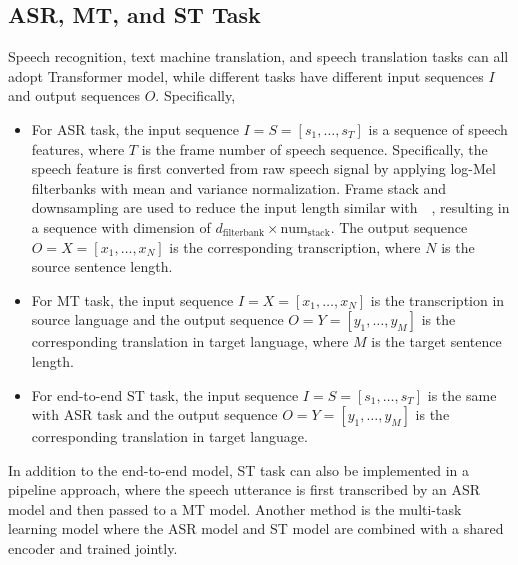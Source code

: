 \documentclass[letterpaper]{article} %
\begin{document}
\subsection{ASR, MT, and ST Task}
Speech recognition, text machine translation, and speech translation tasks can all adopt Transformer model, while different tasks have different input sequences $\mathbf{\mathit{I}}$ and output sequences $\mathbf{\mathit{O}}$. Specifically,
\begin{itemize}
	\item For ASR task, the input sequence $\mathbf{\mathit{I}}=\mathbf{\mathit{S}}=[s_1,\dots,s_T]$ is a sequence of speech features, where $T$ is the frame number of speech sequence. Specifically, the speech feature is first converted from raw speech signal by applying log-Mel filterbanks with mean and variance normalization. Frame stack and downsampling are used  to reduce the input length similar with~\citeauthor{sak2015fast}~, resulting in a sequence with dimension of $d_{\textrm{filterbank}} \times \textrm{num}_{\textrm{stack}}$. 
	The output sequence $\mathbf{\mathit{O}}=\mathbf{\mathit{X}}=[x_1,\dots,x_N]$ is the corresponding transcription, where $N$ is the source sentence length.
	\item For  MT task, the input sequence $\mathbf{\mathit{I}}=\mathbf{\mathit{X}}=[x_1,\dots,x_N]$ is  the transcription in source language and the output sequence $\mathbf{\mathit{O}}=\mathbf{\mathit{Y}}=[y_1,\dots,y_M]$ is the corresponding translation in target language, where $M$ is the target sentence length.
	\item For end-to-end ST task, the input sequence $\mathbf{\mathit{I}}=\mathbf{\mathit{S}}=[s_1,\dots,s_T]$ is the same with ASR task and the output sequence $\mathbf{\mathit{O}}=\mathbf{\mathit{Y}}=[y_1,\dots,y_M]$ is the corresponding translation in target language.
\end{itemize}

In addition to the end-to-end model, ST task can also be implemented in a pipeline approach, where the speech utterance is first transcribed by an ASR model and then passed to a MT model. Another method is the multi-task learning model where the ASR model and ST model are combined with a shared encoder and trained jointly. 
\end{document}
